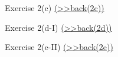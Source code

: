 \documentclass[
  10pt,
  ignorenonframetext,
]{beamer}
\begin{document}
\begin{frame}{}
\protect\hypertarget{section-2}{}
\end{frame}

\begin{frame}{}
\protect\hypertarget{section-3}{}
\end{frame}

\begin{frame}{Exercise 2(c)
\footnotesize \protect\hyperlink{Ex2-CountryFEs-A}{(\textgreater\textgreater back(2c))}
\normalsize }
\protect\hypertarget{Ex2-CountryFEs}{}
\end{frame}

\begin{frame}{Exercise 2(d-I)
\footnotesize \protect\hyperlink{Ex2-BothFEs-A}{(\textgreater\textgreater back(2d))}
\normalsize }
\protect\hypertarget{Ex2-BothFEs}{}
\end{frame}

\begin{frame}{Exercise 2(e-II)
\footnotesize \protect\hyperlink{Ex2-BothFEswithcontrols-A}{(\textgreater\textgreater back(2e))}
\normalsize}
\protect\hypertarget{exercise-2e-ii-back2e}{}
\end{frame}
\end{document}
